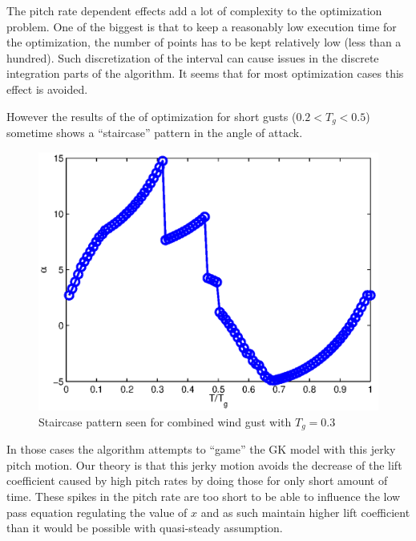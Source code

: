 \FloatBarrier
The pitch rate dependent effects add a lot of complexity to the optimization problem.
One of the biggest is that to keep a reasonably low execution time for the optimization, the number of points has to be kept relatively low (less than a hundred).
Such discretization of the interval can cause issues in the discrete integration parts of the algorithm.
It seems that for most optimization cases this effect is avoided.

\par However the results of the of optimization for short gusts ($0.2<T_g<0.5$) sometime shows a ``staircase'' pattern in the angle of attack.

\begin{figure}[h]
  \centering
  \includegraphics{./Figures/Alpha_vs_T_Windtype=3_Tg=0p3_GK_alphamax=20.eps}
  \caption{Staircase pattern seen for combined wind gust with $T_g=0.3$}
  \label{fig:staircase_case}
\end{figure}

\par In those cases the algorithm attempts to ``game'' the GK model with this jerky pitch motion.
Our theory is that this jerky motion avoids the decrease of the lift coefficient caused by high pitch rates by doing those for only short amount of time.
These spikes in the pitch rate are too short to be able to influence the low pass equation regulating the value of $x$ and as such maintain higher lift coefficient than it would be possible with quasi-steady assumption.

